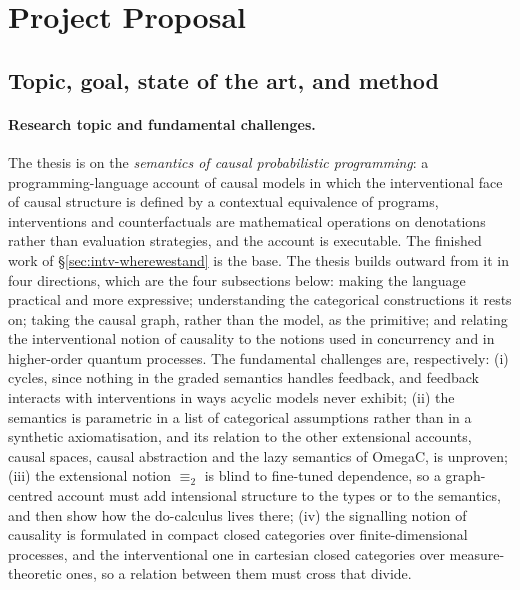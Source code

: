 \section{Project Proposal}\label{sec:proposal}

\subsection{Topic, goal, state of the art, and method}

\paragraph{Research topic and fundamental challenges.}
The thesis is on the \emph{semantics of causal probabilistic programming}: a programming-language account of causal models in which the interventional face of causal structure is defined by a contextual equivalence of programs, interventions and counterfactuals are mathematical operations on denotations rather than evaluation strategies, and the account is executable. The finished work of \S\ref{sec:intv-wherewestand} is the base. The thesis builds outward from it in four directions, which are the four subsections below: making the language practical and more expressive; understanding the categorical constructions it rests on; taking the causal graph, rather than the model, as the primitive; and relating the interventional notion of causality to the notions used in concurrency and in higher-order quantum processes. The fundamental challenges are, respectively: (i) cycles, since nothing in the graded semantics handles feedback, and feedback interacts with interventions in ways acyclic models never exhibit; (ii) the semantics is parametric in a list of categorical assumptions rather than in a synthetic axiomatisation, and its relation to the other extensional accounts, causal spaces, causal abstraction and the lazy semantics of OmegaC, is unproven; (iii) the extensional notion $\equiv_2$ is blind to fine-tuned dependence, so a graph-centred account must add intensional structure to the types or to the semantics, and then show how the do-calculus lives there; (iv) the signalling notion of causality is formulated in compact closed categories over finite-dimensional processes, and the interventional one in cartesian closed categories over measure-theoretic ones, so a relation between them must cross that divide.

